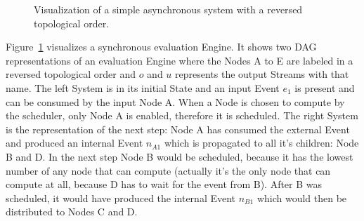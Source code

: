 
\begin{figure}
  \caption{Visualization of a simple asynchronous system with a reversed topological order.}
\label{fig:chap3:sec_sync:visual_dag}
\end{figure}

Figure~\ref{fig:chap3:sec_sync:visual_dag} visualizes a synchronous evaluation Engine.
It shows two DAG representations of an evaluation Engine  where the Nodes A to E are labeled in a reversed topological order and \(o\) and \(u\) represents the output Streams with that name.
The left System is in its initial State and an input Event \(e_1\) is present and can be consumed by the input Node A.
When a Node is chosen to compute by the scheduler, only Node A is enabled, therefore it is scheduled.
The right System is the representation of the next step: Node A has consumed the external Event and produced an internal Event \(n_{A1}\) which is propagated to all it's children: Node B and D.
In the next step Node B would be scheduled, because it has the lowest number of any node that can compute (actually it's the only node that can compute at all, because D has to wait for the event from B).
After B was scheduled, it would have produced the internal Event \(n_{B1}\) which would then be distributed to Nodes C and D.

